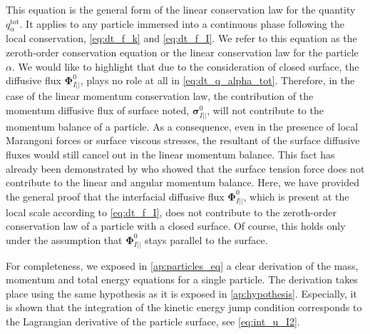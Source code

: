 This equation is the general form of the linear conservation law for the quantity $q_\alpha^\text{tot}$.
It applies to any particle immersed into a continuous phase following the local conservation, \ref{eq:dt_f_k} and \ref{eq:dt_f_I}.
We refer to this equation as the zeroth-order conservation equation or the linear conservation law for the particle $\alpha$.
We would like to highlight that due to the consideration of closed surface, the diffusive flux $\mathbf{\Phi}_{I||}^0$, plays no role at all in \ref{eq:dt_q_alpha_tot}.
Therefore, in the case of the linear momentum conservation law, the contribution of the momentum diffusive flux of surface noted, $\bm\sigma_{I||}^0$, will not contribute to the momentum balance of a particle.
As a consequence, even in the presence of local Marangoni forces or surface viscous stresses, the resultant of the surface diffusive fluxes would still cancel out in the linear momentum balance.
This fact has already been demonstrated by \citet{hesla1993note} who showed that the surface tension force does not contribute to the linear and angular momentum balance. 
Here, we have provided the general proof that the interfacial diffusive flux $\mathbf{\Phi}_{I||}^0$, which is present at the local scale according to \ref{eq:dt_f_I}, does not contribute to the zeroth-order conservation law of a particle with a closed surface.
Of course, this holds only under the assumption that $\mathbf{\Phi}_{I||}^0$ stays parallel to the surface. 

For completeness, we exposed in \ref{ap:particles_eq} a clear derivation of the mass, momentum and total energy equations for a single particle.
The derivation takes place using the same hypothesis as it is exposed in \ref{ap:hypothesis}.
Especially, it is shown that the integration of the kinetic energy jump condition corresponds to the Lagrangian derivative of the particle surface, see \ref{eq:int_u_I2}. 

